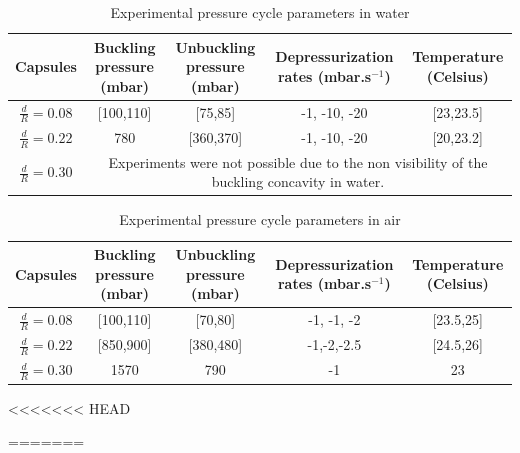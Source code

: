 \begin{table}[H]
	\centering
		\begin{adjustbox}{width=\textwidth}
			\begin{tabular}{|c|c|c|c|c|}
				\hline
				Capsules & Buckling pressure (mbar) & Unbuckling pressure (mbar) & Depressurization rates (mbar.s$^{-1}$) & Temperature (Celsius) \\
				\hline
				$\frac{d}{R} = 0.08 $ & [100,110]& [75,85] & -1, -10, -20 & [23,23.5]\\
				\hline
				$\frac{d}{R} = 0.22$ & 780 & [360,370] & -1, -10, -20 & [20,23.2]\\
				\hline
				$\frac{d}{R} = 0.30$ &  \multicolumn{4}{c|}{Experiments were not possible due to the non visibility of the buckling concavity in water.}\\
				\hline
			\end{tabular}
		\end{adjustbox}
	
	\caption{Experimental pressure cycle parameters in water}
	\label{tab:Experimental_pressure_cycle_parameters_in_water}
\end{table}

\begin{table}[H]
	\centering
		\begin{adjustbox}{width=\textwidth}
			\begin{tabular}{|c|c|c|c|c|}
				\hline
				Capsules & Buckling pressure (mbar) & Unbuckling pressure (mbar) & Depressurization rates (mbar.s$^{-1}$) & Temperature (Celsius) \\
				\hline
				$\frac{d}{R} = 0.08$ & [100,110]& [70,80] & -1, -1, -2 & [23.5,25]\\
				$\frac{d}{R} = 0.22$ & [850,900] & [380,480] & -1,-2,-2.5 & [24.5,26]\\
				$\frac{d}{R} = 0.30$ & 1570 & 790 & -1 & 23 \\
				\hline
			\end{tabular}
		\end{adjustbox}
	\caption{Experimental pressure cycle parameters in air}
	\label{tab:Experimental_pressure_cycle_parameters_in_air}
\end{table}


<<<<<<< HEAD

=======
